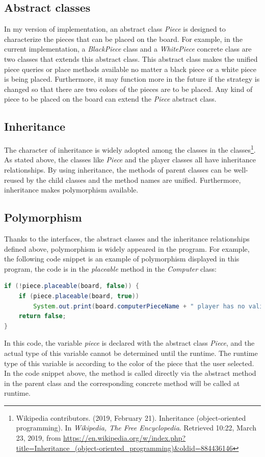 \documentclass[a4paper]{report}
\begin{document}
\subsection{Abstract classes}
In my version of implementation, an abstract class \emph{Piece} is designed to characterize the pieces that can be placed on the board. For example, in the current implementation, a \emph{BlackPiece} class and a \emph{WhitePiece} concrete class are two classes that extends this abstract class. This abstract class makes the unified piece queries or place methods available no matter a black piece or a white piece is being placed. Furthermore, it may function more in the future if the strategy is changed so that there are two colors of the pieces are to be placed. Any kind of piece to be placed on the board can extend the \emph{Piece} abstract class.
\subsection{Inheritance}
The character of inheritance is widely adopted among the classes in the classes\footnote{Wikipedia contributors. (2019, February 21). Inheritance (object-oriented programming). In \emph{Wikipedia, The Free Encyclopedia}. Retrieved 10:22, March 23, 2019, from \url{https://en.wikipedia.org/w/index.php?title=Inheritance_(object-oriented_programming)&oldid=884436146}
}. As stated above, the classes like \emph{Piece} and the player classes all have inheritance relationships. By using inheritance, the methods of parent classes can be well-reused by the child classes and the method names are unified. Furthermore, inheritance makes polymorphism available.
\subsection{Polymorphism}
Thanks to the interfaces, the abstract classes and the inheritance relationships defined above, polymorphism is widely appeared in the program. For example, the following code snippet is an example of polymorphism displayed in this program, the code is in the \emph{placeable} method in the \emph{Computer} class:
\begin{lstlisting}[language=java]
if (!piece.placeable(board, false)) {
    if (piece.placeable(board, true))
        System.out.print(board.computerPieceName + " player has no valid move. ");
    return false;
}
\end{lstlisting}
In this code, the variable \emph{piece} is declared with the abstract class \emph{Piece}, and the actual type of this variable cannot be determined until the runtime. The runtime type of this variable is according to the color of the piece that the user selected. In the code snippet above, the method is called directly via the abstract method in the parent class and the corresponding concrete method will be called at runtime.
\end{document}
